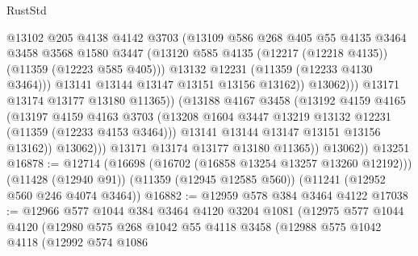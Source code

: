 \begin{lexlean}{RustStd}
\begin{coremodule}
{{{{{{{{{{{{{{{{{{{                              @13102
                              @205
                              @4138
                              @4142
                              @3703
                              (@13109
                                @586
                                @268
                                @405
                                @55
                                @4135
                                @3464
                                @3458
                                @3568
                                @1580
                                @3447
                                (@13120
                                  @585
                                  @4135
                                  (@12217 (@12218 @4135))
                                  (@11359 (@12223 @585 @405)))
                                @13132
                                @12231
                                (@11359 (@12233 @4130 @3464)))
                              @13141
                              @13144
                              @13147
                              @13151
                              @13156
                              @13162))
                          @13062)))
                    @13171
                    @13174
                    @13177
                    @13180
                    @11365))
                (@13188
                  @4167
                  @3458
                  (@13192
                    @4159
                    @4165
                    (@13197
                      @4159
                      @4163
                      @3703
                      (@13208 @1604 @3447 @13219 @13132 @12231 (@11359 (@12233 @4153 @3464)))
                      @13141
                      @13144
                      @13147
                      @13151
                      @13156
                      @13162))
                  @13062)))
            @13171
            @13174
            @13177
            @13180
            @11365))
        @13062))
    @13251
@16878 := @12714
    (@16698 (@16702 (@16858 @13254 @13257 @13260 @12192)))
    (@11428 (@12940 @91))
    (@11359 (@12945 @12585 @560))
    (@11241 (@12952 @560 @246 @4074 @3464))
@16882 := @12959 @578 @384 @3464 @4122
@17038 := @12966
    @577
    @1044
    @384
    @3464
    @4120
    @3204
    @1081
    (@12975
      @577
      @1044
      @4120
      (@12980
        @575
        @268
        @1042
        @55
        @4118
        @3458
        (@12988
          @575
          @1042
          @4118
          (@12992
            @574
            @1086
}}}}}}}}}}}}}}}}}}}
\end{coremodule}
\end{lexlean}

